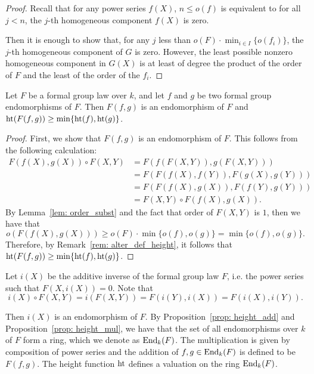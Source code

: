 \begin{proof}
    Recall that for any power series $f(X)$, $n \le o(f)$ is equivalent to for all $j < n$, the $j$-th homogeneous component
    $f(X)$ is zero.

    Then it is enough to show that, for any $j$ less than $o(F) \cdot  \min_{i\in I}\{o(f_i)\}$,
    the $j$-th homogeneous
    component of $G$ is zero. However, the least possible nonzero homogeneous component in
    $G(X)$ is at least of degree the product of
    the order of $F$ and the least of the order of the $f_i$.
\end{proof}

\begin{proposition}
    Let $F$ be a formal group law over $k$, and let $f$ and $g$ be two formal group
    endomorphisms of $F$. Then $F(f, g)$ is an endomorphism of $F$ and
    $\mathrm{ht} (F(f,g)) \ge \min \{\mathrm{ht} (f), \mathrm{ht}(g)\}$.
    \label{prop: height_add}
\end{proposition}

\begin{proof}
    First, we show that $F(f,g)$ is an endomorphism of $F$. This follows from
    the following calculation:
    \begin{align*}
        F(f(X), g(X)) \circ F(X,Y) &= F(f(F(X,Y)), g(F(X,Y))) \\
        & = F(F(f(X),f(Y)), F(g(X), g(Y))) \\
        & = F(F(f(X), g(X)), F(f(Y), g(Y))) \\
        & = F(X,Y) \circ F(f(X), g(X)).
    \end{align*}
    By Lemma~\ref{lem: order_subst} and the fact that order of $F(X,Y)$ is $1$,
    then we have that
    \[ o(F(f(X), g(X))) \ge o(F) \cdot \min\{o(f),o(g)\} = \min\{o(f),o(g)\}. \]
    Therefore,
    by Remark~\ref{rem: alter_def_height}, it follows that
    $\mathrm{ht} (F(f,g)) \ge \min \{\mathrm{ht} (f), \mathrm{ht}(g)\}$.
\end{proof}

\begin{remark}
    Let $i(X)$ be the additive inverse of the formal group law $F$, i.e. the power
    series such that $F(X, i(X)) = 0$.
    Note that
    \[i(X) \circ F(X,Y) = i(F(X,Y)) = F(i(Y), i(X)) = F(i(X), i(Y)). \]

    Then $i(X)$ is an endomorphism of $F$. By Proposition~\ref{prop: height_add} and
    Proposition~\ref{prop: height_mul}, we have that the set of all endomorphisms over $k$ of $F$ form a
    ring, which we denote as $\operatorname{End}_k(F)$. The multiplication is given by composition of power series and the addition
    of $f, g \in \operatorname{End}_k(F)$ is defined to be $F(f,g)$. The height function
    $\mathrm{ht}$ defines a valuation on the ring $\operatorname{End}_k(F)$.
\end{remark}

